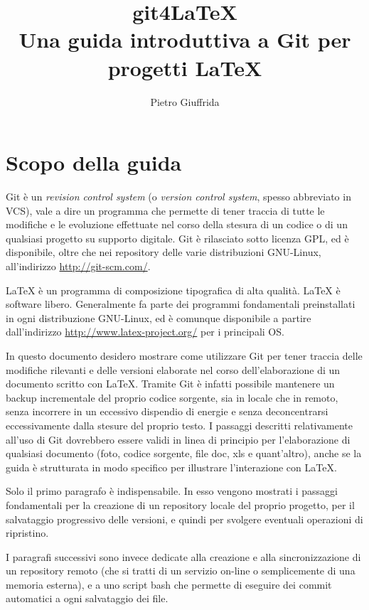 \documentclass[a4paper,12pt,oneside]{article}
\begin{document}
\title{git4\LaTeX \\
  Una guida introduttiva a Git per progetti \LaTeX}
\author{Pietro Giuffrida}
\maketitle
\clearpage
\tableofcontents
\clearpage
\section{Scopo della guida}
Git è un \emph{revision control system} (o \emph{version control system}, spesso
abbreviato in VCS), vale a dire un programma che permette di tener traccia di
tutte le modifiche e le evoluzione effettuate nel corso della stesura di un
codice o di un qualsiasi progetto su supporto digitale. Git è rilasciato sotto
licenza GPL, ed è disponibile, oltre che nei repository delle varie distribuzioni
GNU-Linux, all'indirizzo \url{http://git-scm.com/}.

\LaTeX{} è un programma di composizione tipografica di alta qualità. \LaTeX{} è
software libero. Generalmente fa parte dei programmi fondamentali preinstallati in
ogni distribuzione GNU-Linux, ed è comunque disponibile a partire dall'indirizzo
\url{http://www.latex-project.org/} per i principali OS.

In questo documento desidero mostrare come utilizzare Git per tener traccia
delle modifiche rilevanti e delle versioni elaborate nel corso dell'elaborazione
di un documento scritto con \LaTeX. Tramite Git è infatti possibile mantenere un
backup incrementale del proprio codice sorgente, sia in locale che in remoto,
senza incorrere in un eccessivo dispendio di energie e senza deconcentrarsi
eccessivamente dalla stesure del proprio testo. I passaggi descritti
relativamente all'uso di Git dovrebbero essere validi in linea di principio per
l'elaborazione di qualsiasi documento (foto, codice sorgente, file doc, xls
e quant'altro), anche se la guida è strutturata in modo specifico per
illustrare l'interazione con \LaTeX.

Solo il primo paragrafo è indispensabile. In esso vengono mostrati i passaggi
fondamentali per la creazione di un repository locale del proprio progetto, per
il salvataggio progressivo delle versioni, e quindi per svolgere eventuali
operazioni di ripristino.

I paragrafi successivi sono invece dedicate alla creazione e alla
sincronizzazione di un repository remoto (che si tratti di un servizio on-line
o semplicemente di una memoria esterna), e a uno script bash che permette di
eseguire dei commit automatici a ogni salvataggio dei file.
\end{document}

